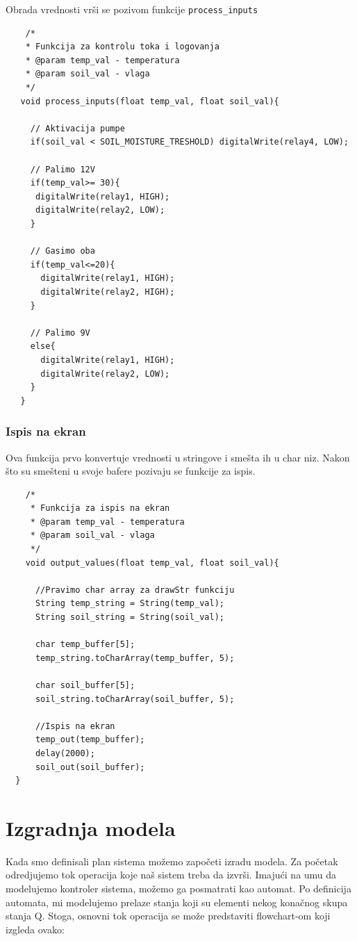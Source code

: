 \documentclass[a4paper,11pt]{book}
\begin{document}
  Obrada vrednosti vrši se pozivom funkcije \verb|process_inputs|

  \begin{lstlisting}
    /*
    * Funkcija za kontrolu toka i logovanja
    * @param temp_val - temperatura
    * @param soil_val - vlaga
    */
   void process_inputs(float temp_val, float soil_val){
    
     // Aktivacija pumpe
     if(soil_val < SOIL_MOISTURE_TRESHOLD) digitalWrite(relay4, LOW);

     // Palimo 12V
     if(temp_val>= 30){
      digitalWrite(relay1, HIGH);
      digitalWrite(relay2, LOW);
     }

     // Gasimo oba
     if(temp_val<=20){
       digitalWrite(relay1, HIGH);
       digitalWrite(relay2, HIGH);
     }

     // Palimo 9V
     else{
       digitalWrite(relay1, HIGH);
       digitalWrite(relay2, LOW);
     }
   }
    \end{lstlisting}

  
    \subsection{Ispis na ekran}

    Ova funkcija prvo konvertuje vrednosti u stringove i smešta ih u char niz. Nakon što su smešteni u svoje bafere pozivaju se funkcije za ispis.

    
  \begin{lstlisting}
    /*
     * Funkcija za ispis na ekran
     * @param temp_val - temperatura
     * @param soil_val - vlaga
     */
    void output_values(float temp_val, float soil_val){

	  //Pravimo char array za drawStr funkciju
	  String temp_string = String(temp_val);
	  String soil_string = String(soil_val);

	  char temp_buffer[5];
	  temp_string.toCharArray(temp_buffer, 5);

	  char soil_buffer[5];
	  soil_string.toCharArray(soil_buffer, 5);

	  //Ispis na ekran
	  temp_out(temp_buffer);
	  delay(2000);
	  soil_out(soil_buffer);  
  }
    \end{lstlisting}


\chapter{Izgradnja modela}

Kada smo definisali plan sistema možemo započeti izradu modela. Za početak odredjujemo tok operacija koje naš sistem treba da izvrši. Imajući na umu da modelujemo kontroler sistema, možemo ga posmatrati kao automat. Po definicija automata, mi modelujemo prelaze stanja koji su elementi nekog konačnog skupa stanja Q. Stoga, osnovni tok operacija se može predstaviti flowchart-om koji izgleda ovako:
\end{document}
